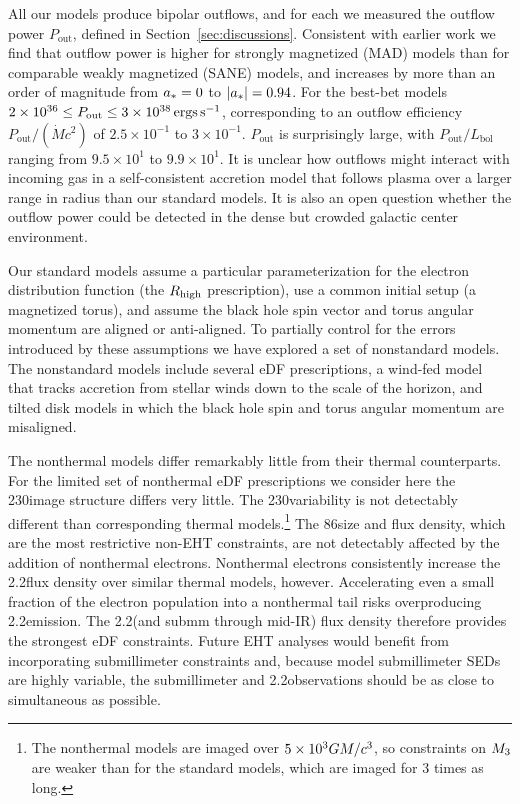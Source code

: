 All our models produce bipolar outflows, and for each we measured the outflow power $P_\mathrm{out}$, defined in Section~\ref{sec:discussions}. Consistent with earlier work we find that outflow power is higher for strongly magnetized (MAD) models than for comparable weakly magnetized (SANE) models, and increases by more than an order of magnitude from $a_* = 0$ to $|a_*| = 0.94$.  For the best-bet models $2 \times 10^{36} \le P_\mathrm{out} \le 3 \times 10^{38} \,\mathrm{ergs\,s^{-1}}$, corresponding to an outflow efficiency $P_\mathrm{out}/(\dot{M} c^2)$ of $2.5\times10^{-1}$ to $3\times10^{-1}$.  $P_\mathrm{out}$ is surprisingly large, with $P_\mathrm{out}/L_\mathrm{bol}$ ranging from $9.5\times10^{1}$ to $9.9\times10^{1}$.  It is unclear how outflows might interact with incoming gas in a self-consistent accretion model that follows plasma over a larger range in radius than our standard models.  It is also an open question whether the outflow power could be detected in the dense but crowded galactic center environment.

Our standard models assume a particular parameterization for the electron distribution function (the $R_\mathrm{high}$ prescription), use a common initial setup (a magnetized torus), and assume the black hole spin vector and torus angular momentum are aligned or anti-aligned.  To partially control for the errors introduced by these assumptions we have explored a set of nonstandard models.  The nonstandard models include several eDF prescriptions, a wind-fed model that tracks accretion from stellar winds down to the scale of the horizon, and tilted disk models in which the black hole spin and torus angular momentum are misaligned.

The nonthermal models differ remarkably little from their thermal counterparts.
For the limited set of nonthermal eDF prescriptions we consider here the 230\GHz image structure differs very little.  The 230\GHz variability is not detectably different than corresponding thermal models.\footnote{The nonthermal models are imaged over $5\times 10^3GM/c^3$, so constraints on $M_{3}$ are weaker than for the standard models, which are imaged for 3 times as long.}  The 86\GHz size and flux density, which are the most restrictive non-EHT constraints, are not detectably affected by the addition of nonthermal electrons.  Nonthermal electrons consistently increase the 2.2\um flux density over similar thermal models, however.  Accelerating even a small fraction of the electron population into a nonthermal tail risks overproducing 2.2\um emission.  The 2.2\um (and submm through mid-IR) flux density therefore provides the strongest eDF constraints.  Future EHT analyses would benefit from incorporating submillimeter constraints \citep[e.g.]{2019ApJ...881L...2B} and, because model submillimeter SEDs are highly variable, the submillimeter and 2.2\um observations should be as close to simultaneous as possible.

